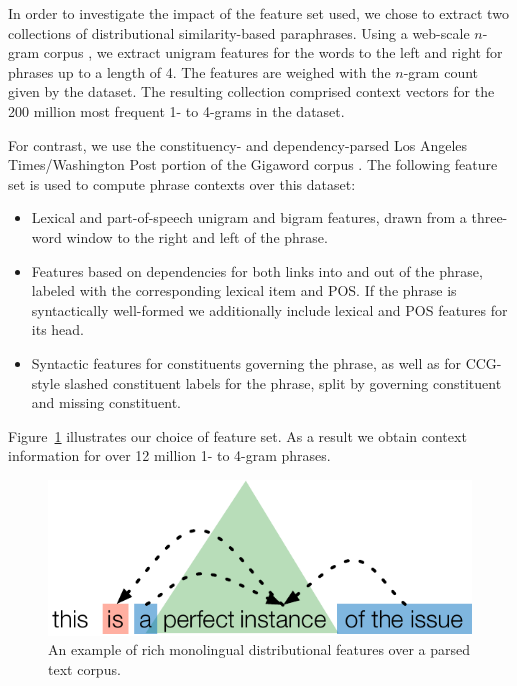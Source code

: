 \documentclass[11pt]{article}
\begin{document}
In order to investigate the impact of the feature set used, we chose
to extract two collections of distributional similarity-based
paraphrases. Using a web-scale $n$-gram corpus
\cite{GoogleNgrams,LinEtAlLREC10}, we extract unigram features for the
words to the left and right for phrases up to a length of 4. The
features are weighed with the $n$-gram count given by the dataset. The
resulting collection comprised context vectors for the 200 million
most frequent 1- to 4-grams in the dataset.

For contrast, we use the constituency- and dependency-parsed Los
Angeles Times/Washington Post portion of the Gigaword corpus
\cite{Gigaword}. The following feature set is used to compute phrase
contexts over this dataset:
\begin{itemize}
\item Lexical and part-of-speech unigram and bigram features,
  drawn from a three-word window to the right and left of the phrase. 
\item Features based on dependencies for both links into and out of
  the phrase, labeled with the corresponding lexical item and POS. If
  the phrase is syntactically well-formed we additionally include
  lexical and POS features for its head.
\item Syntactic features for constituents governing the phrase, as
  well as for CCG-style slashed constituent labels for the phrase,
  split by governing constituent and missing constituent. 
\end{itemize}
Figure~\ref{fig-rich-context} illustrates our choice of feature
set. As a result we obtain context information for over 12 million 1-
to 4-gram phrases.

\begin{figure}[!t]
\begin{center}
\includegraphics[width=0.99\linewidth]{figures/rich_context.pdf}
\end{center}
\caption{An example of rich monolingual distributional features over a
parsed text corpus.}\label{fig-rich-context}
\end{figure}
\end{document}
